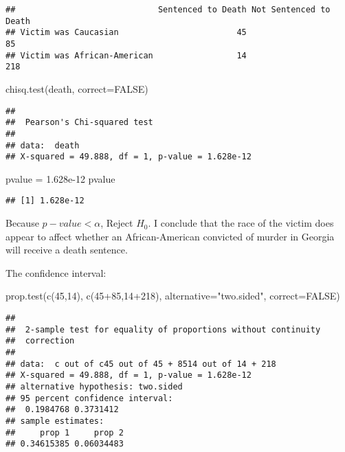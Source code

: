 \documentclass[
]{article}
\newenvironment{Shaded}{\begin{snugshade}}{\end{snugshade}}
\newcommand{\AttributeTok}[1]{\textcolor[rgb]{0.77,0.63,0.00}{#1}}
\newcommand{\ConstantTok}[1]{\textcolor[rgb]{0.00,0.00,0.00}{#1}}
\newcommand{\DecValTok}[1]{\textcolor[rgb]{0.00,0.00,0.81}{#1}}
\newcommand{\FloatTok}[1]{\textcolor[rgb]{0.00,0.00,0.81}{#1}}
\newcommand{\FunctionTok}[1]{\textcolor[rgb]{0.00,0.00,0.00}{#1}}
\newcommand{\NormalTok}[1]{#1}
\newcommand{\OtherTok}[1]{\textcolor[rgb]{0.56,0.35,0.01}{#1}}
\newcommand{\SpecialCharTok}[1]{\textcolor[rgb]{0.00,0.00,0.00}{#1}}
\newcommand{\StringTok}[1]{\textcolor[rgb]{0.31,0.60,0.02}{#1}}
\begin{document}
\begin{verbatim}
##                             Sentenced to Death Not Sentenced to Death
## Victim was Caucasian                        45                     85
## Victim was African-American                 14                    218
\end{verbatim}

\begin{Shaded}
\begin{Highlighting}[]
\FunctionTok{chisq.test}\NormalTok{(death, }\AttributeTok{correct=}\ConstantTok{FALSE}\NormalTok{)}
\end{Highlighting}
\end{Shaded}

\begin{verbatim}
## 
##  Pearson's Chi-squared test
## 
## data:  death
## X-squared = 49.888, df = 1, p-value = 1.628e-12
\end{verbatim}

\begin{Shaded}
\begin{Highlighting}[]
\NormalTok{pvalue }\OtherTok{=} \FloatTok{1.628e{-}12}
\NormalTok{pvalue}
\end{Highlighting}
\end{Shaded}

\begin{verbatim}
## [1] 1.628e-12
\end{verbatim}

Because \(p-value < \alpha\), Reject \(H_{0}\). I conclude that the race
of the victim does appear to affect whether an African-American
convicted of murder in Georgia will receive a death sentence.

The confidence interval:

\begin{Shaded}
\begin{Highlighting}[]
\FunctionTok{prop.test}\NormalTok{(}\FunctionTok{c}\NormalTok{(}\DecValTok{45}\NormalTok{,}\DecValTok{14}\NormalTok{), }\FunctionTok{c}\NormalTok{(}\DecValTok{45}\SpecialCharTok{+}\DecValTok{85}\NormalTok{,}\DecValTok{14}\SpecialCharTok{+}\DecValTok{218}\NormalTok{), }\AttributeTok{alternative=}\StringTok{"two.sided"}\NormalTok{, }\AttributeTok{correct=}\ConstantTok{FALSE}\NormalTok{)}
\end{Highlighting}
\end{Shaded}

\begin{verbatim}
## 
##  2-sample test for equality of proportions without continuity
##  correction
## 
## data:  c out of c45 out of 45 + 8514 out of 14 + 218
## X-squared = 49.888, df = 1, p-value = 1.628e-12
## alternative hypothesis: two.sided
## 95 percent confidence interval:
##  0.1984768 0.3731412
## sample estimates:
##     prop 1     prop 2 
## 0.34615385 0.06034483
\end{verbatim}
\end{document}
